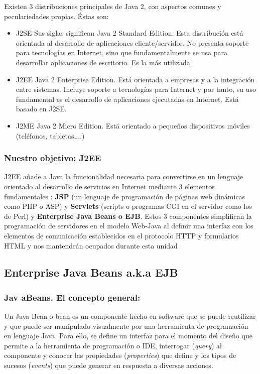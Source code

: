 \documentclass{apuntes}
\begin{document}
Existen 3 distribuciones principales de Java 2, con aspectos comunes y peculariedades propias. Éstas son:
\begin{itemize}
\item J2SE
Sus siglas significan Java 2 Standard Edition.
Esta distribución está orientada al desarrollo de aplicaciones cliente/servidor. No presenta soporte para tecnologías en Internet, sino que fundamentalmente se usa para desarrollar aplicaciones de escritorio. Es la más utilizada.
\item J2EE 
Java 2 Enterprise Edition. Está orientada a empresas y a la integración entre sistemas. Incluye soporte a tecnologías para Internet y por tanto, su uso fundamental es el desarrollo de aplicaciones ejecutadas en Internet. Está  basado en J2SE.
\item J2ME 
Java 2 Micro Edition. Está orientado a pequeños dispositivos móviles (teléfonos, tabletas,...)
\end{itemize}

\subsubsection{Nuestro objetivo: J2EE}
J2EE añade a Java la funcionalidad necesaria para convertirse en un lenguaje orientado al desarrollo de servicios en Internet mediante 3 elementos fundamentales : \textbf {JSP} (un lenguaje de programación de páginas web dinámicas como PHP o ASP) y \textbf{Servlets} (scripts o programas CGI en el servidor como los de Perl) y \textbf{Enterprise Java Beans o EJB}.
Estos 3 componentes simplifican la programación de servidores en el modelo Web-Java al definir una interfaz con los elementos de comunicación establecidos en el protocolo HTTP y formularios HTML y nos mantendrán ocupados durante esta unidad
\subsection{Enterprise Java Beans a.k.a EJB}
\subsubsection{Jav aBeans. El concepto general:}

Un Java Bean o bean es un componente hecho en software que se puede reutilizar y que puede ser manipulado visualmente por una herramienta de programación en lenguaje Java.
Para ello, se define un interfaz para el momento del diseño que permite a la herramienta de programación o IDE, interrogar (\emph{query}) al componente y conocer las propiedades (\emph{properties}) que define y los tipos de sucesos (\emph{events}) que puede generar en respuesta a diversas acciones.
\end{document}
